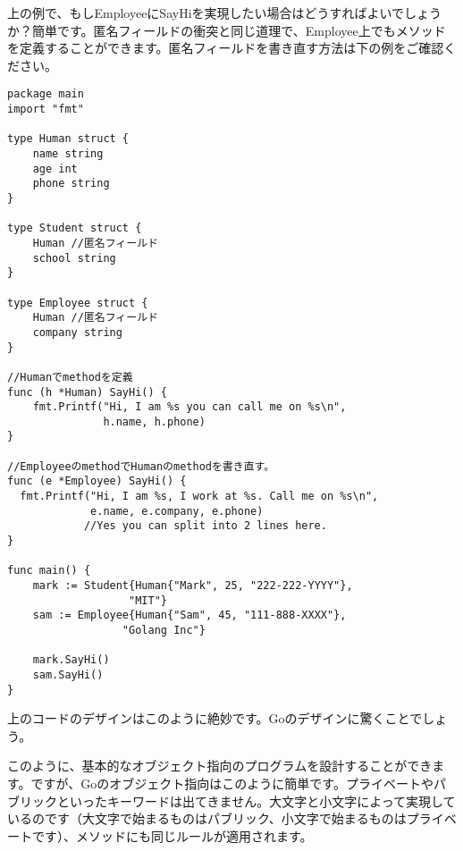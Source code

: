 上の例で、もしEmployeeにSayHiを実現したい場合はどうすればよいでしょうか？簡単です。匿名フィールドの衝突と同じ道理で、Employee上でもメソッドを定義することができます。匿名フィールドを書き直す方法は下の例をご確認ください。

\begin{lstlisting}[numbers=none]
package main
import "fmt"

type Human struct {
    name string
    age int
    phone string
}

type Student struct {
    Human //匿名フィールド
    school string
}

type Employee struct {
    Human //匿名フィールド
    company string
}

//Humanでmethodを定義
func (h *Human) SayHi() {
    fmt.Printf("Hi, I am %s you can call me on %s\n",
               h.name, h.phone)
}

//EmployeeのmethodでHumanのmethodを書き直す。
func (e *Employee) SayHi() {
  fmt.Printf("Hi, I am %s, I work at %s. Call me on %s\n",
             e.name, e.company, e.phone)
            //Yes you can split into 2 lines here.
}

func main() {
    mark := Student{Human{"Mark", 25, "222-222-YYYY"},
                   "MIT"}
    sam := Employee{Human{"Sam", 45, "111-888-XXXX"},
                  "Golang Inc"}

    mark.SayHi()
    sam.SayHi()
}
\end{lstlisting}

上のコードのデザインはこのように絶妙です。Goのデザインに驚くことでしょう。

このように、基本的なオブジェクト指向のプログラムを設計することができます。ですが、Goのオブジェクト指向はこのように簡単です。プライベートやパブリックといったキーワードは出てきません。大文字と小文字によって実現しているのです（大文字で始まるものはパブリック、小文字で始まるものはプライベートです）、メソッドにも同じルールが適用されます。


